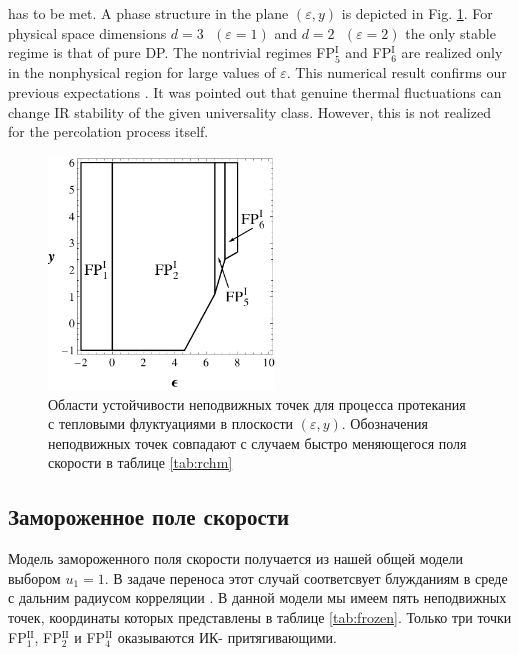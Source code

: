 \documentclass[12pt]{article}
\def\eps{\varepsilon}
\newcommand{\fp}[2]{FP$^{\textrm{#1}}_{#2}$}
\begin{document}
has to be met. 
A phase structure in the plane $(\eps,y)$ is depicted in
Fig. \ref{fig:thermal}. For physical space dimensions 
$d=3\mbox{ }(\eps=1)$ and $d=2\mbox{ }(\eps=2)$ the only stable regime is that of pure DP.
The nontrivial regimes \fp{I}{5} and \fp{I}{6} are realized only in the nonphysical
region for large values of $\eps$. This numerical result confirms our
previous expectations \cite{AntKap08,AntKap10}. 
It was pointed out \cite{HH00} that
genuine thermal fluctuations can change IR stability of the given universality class. 
However, this is not realized for the percolation process itself.
\begin{figure}[h!]
  \centering
  \includegraphics[width=6cm]{ThN.pdf}
  \caption{Области устойчивости неподвижных точек для процесса протекания с тепловыми флуктуациями в плоскости $(\eps,y)$. Обозначения неподвижных точек совпадают с случаем быстро меняющегося поля скорости в таблице \ref{tab:rchm}}
  \label{fig:thermal}
\end{figure}
{\subsection{Замороженное поле скорости} \label{subsec:frm}}
Модель замороженного поля скорости получается из нашей общей модели выбором $u_1=1$.
В задаче переноса \cite{Ant00} этот случай соответсвует блужданиям в среде с дальним радиусом корреляции \cite{HonKar88}.
В данной модели мы имеем пять неподвижных точек, координаты которых представлены в таблице \ref{tab:frozen}.
Только три точки \fp{II}{1}, \fp{II}{2} и \fp{II}{4} оказываются ИК- притягивающими.
\end{document}
